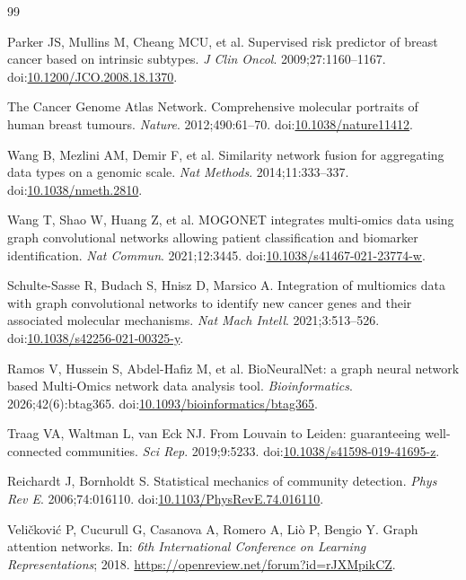 \documentclass[11pt]{article}
\begin{document}
\begin{thebibliography}{99}

Parker JS, Mullins M, Cheang MCU, et al. Supervised risk predictor of breast cancer based on intrinsic subtypes. \textit{J Clin Oncol}. 2009;27:1160--1167. doi:\href{https://doi.org/10.1200/JCO.2008.18.1370}{10.1200/JCO.2008.18.1370}.

The Cancer Genome Atlas Network. Comprehensive molecular portraits of human breast tumours. \textit{Nature}. 2012;490:61--70. doi:\href{https://doi.org/10.1038/nature11412}{10.1038/nature11412}.

Wang B, Mezlini AM, Demir F, et al. Similarity network fusion for aggregating data types on a genomic scale. \textit{Nat Methods}. 2014;11:333--337. doi:\href{https://doi.org/10.1038/nmeth.2810}{10.1038/nmeth.2810}.

Wang T, Shao W, Huang Z, et al. MOGONET integrates multi-omics data using graph convolutional networks allowing patient classification and biomarker identification. \textit{Nat Commun}. 2021;12:3445. doi:\href{https://doi.org/10.1038/s41467-021-23774-w}{10.1038/s41467-021-23774-w}.

Schulte-Sasse R, Budach S, Hnisz D, Marsico A. Integration of multiomics data with graph convolutional networks to identify new cancer genes and their associated molecular mechanisms. \textit{Nat Mach Intell}. 2021;3:513--526. doi:\href{https://doi.org/10.1038/s42256-021-00325-y}{10.1038/s42256-021-00325-y}.

Ramos V, Hussein S, Abdel-Hafiz M, et al. BioNeuralNet: a graph neural network based Multi-Omics network data analysis tool. \textit{Bioinformatics}. 2026;42(6):btag365. doi:\href{https://doi.org/10.1093/bioinformatics/btag365}{10.1093/bioinformatics/btag365}.

Traag VA, Waltman L, van Eck NJ. From Louvain to Leiden: guaranteeing well-connected communities. \textit{Sci Rep}. 2019;9:5233. doi:\href{https://doi.org/10.1038/s41598-019-41695-z}{10.1038/s41598-019-41695-z}.

Reichardt J, Bornholdt S. Statistical mechanics of community detection. \textit{Phys Rev E}. 2006;74:016110. doi:\href{https://doi.org/10.1103/PhysRevE.74.016110}{10.1103/PhysRevE.74.016110}.

Veli\v{c}kovi\'c P, Cucurull G, Casanova A, Romero A, Li\`o P, Bengio Y. Graph attention networks. In: \textit{6th International Conference on Learning Representations}; 2018. \url{https://openreview.net/forum?id=rJXMpikCZ}.


\end{thebibliography}
\end{document}
